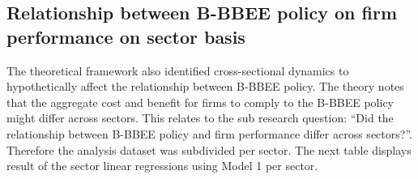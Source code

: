 \subsection{Relationship between B-BBEE policy on firm performance on sector basis}
The theoretical framework also identified cross-sectional dynamics to hypothetically affect the relationship between B-BBEE policy. The theory notes that the aggregate cost and benefit for firms to comply to the B-BBEE policy might differ across sectors. This relates to the sub research question: “Did the relationship between B-BBEE policy and firm performance differ across sectors?”. Therefore the analysis dataset was subdivided per sector. The next table displays result of the sector linear regressions using Model 1 per sector.
\begin{table}[H] 
\tiny %
\centering
\caption{Regression Model 1, sub sections} 
\end{table}
